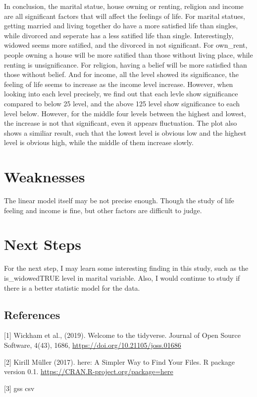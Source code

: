 \documentclass[]{article}
\begin{document}
In conclusion, the marital statue, house owning or renting, religion and
income are all significant factors that will affect the feelings of
life. For marital statues, getting married and living together do have a
more satisfied life than singles, while divorced and seperate has a less
satified life than single. Interestingly, widowed seems more satified,
and the divorced in not significant. For own\_rent, people owning a
house will be more satified than those without living place, while
renting is unsignificance. For religion, having a belief will be more
satisfied than those without belief. And for income, all the level
showed its significance, the feeling of life seems to increase as the
income level increase. However, when looking into each level precisely,
we find out that each levle show significance compared to below 25
level, and the above 125 level show significance to each level below.
However, for the middle four levels between the highest and lowest, the
increase is not that significant, even it appears fluctuation. The plot
also shows a similiar result, such that the lowest level is obvious low
and the highest level is obvious high, while the middle of them increase
slowly.

\hypertarget{weaknesses}{%
\section{Weaknesses}\label{weaknesses}}

The linear model itself may be not precise enough. Though the study of
life feeling and income is fine, but other factors are difficult to
judge.

\hypertarget{next-steps}{%
\section{Next Steps}\label{next-steps}}

For the next step, I may learn some interesting finding in this study,
such as the is\_widowedTRUE level in marital variable. Also, I would
continue to study if there is a better statistic model for the data.

\hypertarget{references}{%
\subsection{References}\label{references}}

{[}1{]} Wickham et al., (2019). Welcome to the tidyverse. Journal of
Open Source Software, 4(43), 1686,
\url{https://doi.org/10.21105/joss.01686}

{[}2{]} Kirill Müller (2017). here: A Simpler Way to Find Your Files. R
package version 0.1. \url{https://CRAN.R-project.org/package=here}

{[}3{]} gss csv
\end{document}
